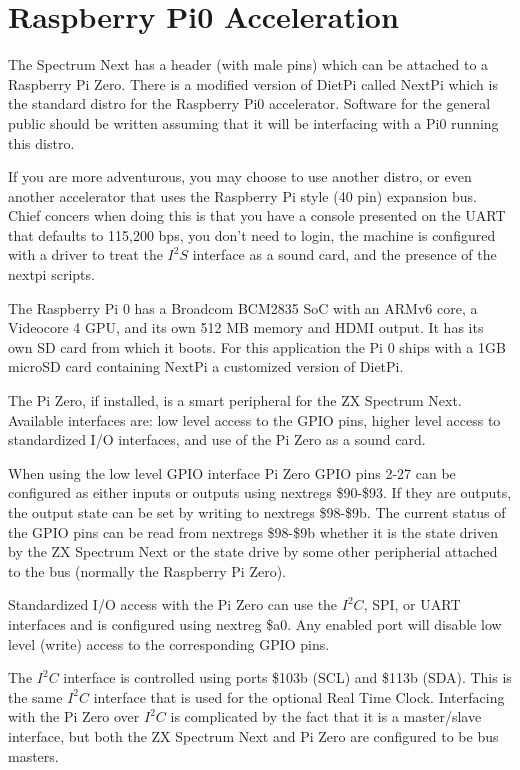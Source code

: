 \chapter{Raspberry Pi0 Acceleration}
The Spectrum Next has a header (with male pins) which can be attached
to a Raspberry Pi Zero. There is a modified version of DietPi called
NextPi which is the standard distro for the Raspberry Pi0
accelerator. Software for the general public should be written
assuming that it will be interfacing with a Pi0 running this distro.

If you are more adventurous, you may choose to use another distro, or
even another accelerator that uses the Raspberry Pi style (40 pin)
expansion bus.  Chief concers when doing this is that you have a
console presented on the UART that defaults to 115,200 bps, you don't
need to login, the machine is configured with a driver to treat the
$I^2S$ interface as a sound card, and the presence of the nextpi
scripts.

The Raspberry Pi 0 has a Broadcom BCM2835 SoC with an ARMv6 core, a
Videocore 4 GPU, and its own 512 MB memory and HDMI output. It has its
own SD card from which it boots. For this application the Pi 0 ships
with a 1GB microSD card containing NextPi a customized version of
DietPi.

The Pi Zero, if installed, is a smart peripheral for the ZX Spectrum
Next. Available interfaces are: low level access to the GPIO pins,
higher level access to standardized I/O interfaces, and use of the Pi
Zero as a sound card.

When using the low level GPIO interface Pi Zero GPIO pins 2-27 can be
configured as either inputs or outputs using nextregs \$90-\$93. If
they are outputs, the output state can be set by writing to nextregs
\$98-\$9b. The current status of the GPIO pins can be read from
nextregs \$98-\$9b whether it is the state driven by the ZX Spectrum
Next or the state drive by some other peripherial attached to the bus
(normally the Raspberry Pi Zero).

Standardized I/O access with the Pi Zero can use the $I^2C$, SPI, or
UART interfaces and is configured using nextreg \$a0. Any enabled port
will disable low level (write) access to the corresponding GPIO
pins.

The $I^2C$ interface is controlled using ports \$103b (SCL) and \$113b
(SDA). This is the same $I^2C$ interface that is used for the optional
Real Time Clock. Interfacing with the Pi Zero over $I^2C$ is
complicated by the fact that it is a master/slave interface, but both
the ZX Spectrum Next and Pi Zero are configured to be bus masters.

